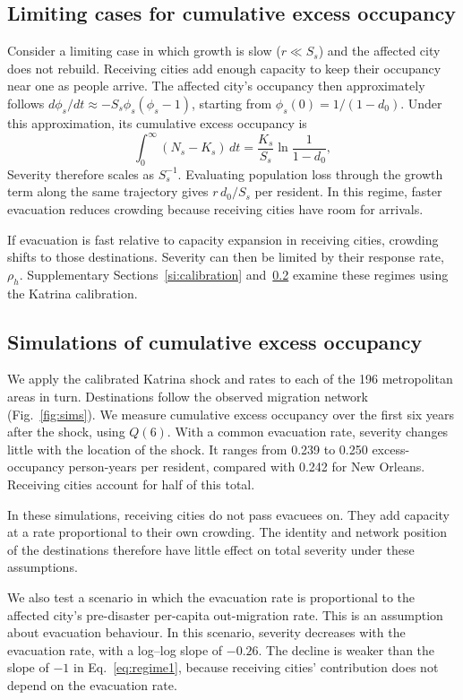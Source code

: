 \documentclass[11pt]{article}
\begin{document}
\subsection{Limiting cases for cumulative excess occupancy}\label{sec:theory}
Consider a limiting case in which growth is slow ($r\ll S_s$) and the affected city does not rebuild. Receiving cities add enough capacity to keep their occupancy near one as people arrive. The affected city's occupancy then approximately follows $d\phi_s/dt\approx-S_s\phi_s(\phi_s-1)$, starting from $\phi_s(0)=1/(1-d_0)$. Under this approximation, its cumulative excess occupancy is
\begin{equation}
\int_0^\infty (N_s-K_s)\,dt = \frac{K_s}{S_s}\ln\frac{1}{1-d_0},
\label{eq:regime1}
\end{equation}
Severity therefore scales as $S_s^{-1}$. Evaluating population loss through the growth term along the same trajectory gives $r\,d_0/S_s$ per resident. In this regime, faster evacuation reduces crowding because receiving cities have room for arrivals.

If evacuation is fast relative to capacity expansion in receiving cities, crowding shifts to those destinations. Severity can then be limited by their response rate, $\rho_h$. Supplementary Sections~\ref{si:calibration} and~\ref{sec:sims} examine these regimes using the Katrina calibration.

\subsection{Simulations of cumulative excess occupancy}\label{sec:sims}
We apply the calibrated Katrina shock and rates to each of the 196 metropolitan areas in turn. Destinations follow the observed migration network (Fig.~\ref{fig:sims}). We measure cumulative excess occupancy over the first six years after the shock, using $Q(6)$. With a common evacuation rate, severity changes little with the location of the shock. It ranges from 0.239 to 0.250 excess-occupancy person-years per resident, compared with 0.242 for New Orleans. Receiving cities account for half of this total.

In these simulations, receiving cities do not pass evacuees on. They add capacity at a rate proportional to their own crowding. The identity and network position of the destinations therefore have little effect on total severity under these assumptions.

We also test a scenario in which the evacuation rate is proportional to the affected city's pre-disaster per-capita out-migration rate. This is an assumption about evacuation behaviour. In this scenario, severity decreases with the evacuation rate, with a log--log slope of $-0.26$. The decline is weaker than the slope of $-1$ in Eq.~\eqref{eq:regime1}, because receiving cities' contribution does not depend on the evacuation rate.
\end{document}
